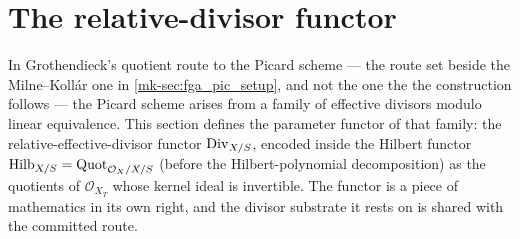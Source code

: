 \section{The relative-divisor functor}
\label{mk-sec:div_functor}

In Grothendieck's quotient route to the Picard scheme --- the route set beside
the Milne--Koll\'ar one in \ref{mk-sec:fga_pic_setup}, and not the one the
the construction follows --- the Picard scheme arises from a family of effective
divisors modulo linear equivalence.  This section defines the parameter functor
of that family: the relative-effective-divisor functor \(\operatorname{Div}_{X/S}\), encoded
inside the Hilbert functor \(\operatorname{Hilb}_{X/S} = \operatorname{Quot}_{\mathcal O_X/X/S}\) (before the
Hilbert-polynomial decomposition) as the quotients of
\(\mathcal O_{X_T}\) whose kernel ideal is invertible.  The functor is a piece of
mathematics in its own right, and the divisor substrate it rests on is shared
with the committed route.

